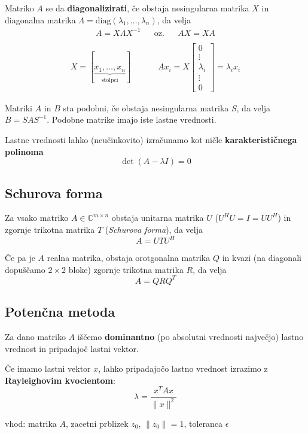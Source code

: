 \begin{multicols}{5}
Matriko $A$ se da \textbf{diagonalizirati}, če obstaja nesingularna matrika $X$ in diagonalna matrika $\Lambda = \text{diag}(\lambda_1, \dots, \lambda_n) $, 
da velja
\begin{align*}
    A = X\Lambda X^{-1} && \text{oz.} && AX = XA \\
\end{align*}
\begin{align*}
X = [\underbrace{x_1, \dots, x_n}_{\text{stolpci}}] && && Ax_i = X\begin{bmatrix}
    0 \\
    \vdots\\
    \lambda_i \\
    \vdots \\
    0
\end{bmatrix}
= \lambda_i x_i
\end{align*}

Matriki $A$ in $B$ sta podobni, če obstaja nesingularna matrika $S$, da velja $B = SAS^{-1}$.
Podobne matrike imajo iste lastne vrednosti.

Lastne vrednosti lahko (neučinkovito) izračunamo kot ničle \textbf{karakterističnega polinoma}
\[\det (A-\lambda I) = 0\] 

\subsection*{Schurova forma}
Za vsako matriko $A \in \mathbb{C}^{m\times n}$ obstaja unitarna matrika $U$ ($U^HU = I = UU^H$) 
in zgornje trikotna matrika $T$ (\textit{Schurova forma}), da velja
\[ A = UTU^H \]

Če pa je $A$ realna matrika, obstaja orotgonalna matrika $Q$ in kvazi (na diagonali dopuščamo $2\times 2$ bloke) 
zgornje trikotna matrika $R$, da velja
\[ A = QRQ^T \]

\subsection*{Potenčna metoda}
Za dano matriko $A$ iščemo \textbf{dominantno} (po absolutni vrednosti največjo) lastno vrednost
in pripadajoč lastni vektor.

Če imamo lastni vektor $x$, lahko pripadajočo lastno vrednost izrazimo z \textbf{Rayleighovim kvocientom}:
\[ \lambda = \frac{x^T A x}{\| x \|^2}\]

\begin{koda}
vhod: matrika $A$, zacetni prblizek $z_0$, $\| z_0 \|=1$, toleranca $\epsilon$


\end{koda}
\end{multicols}
